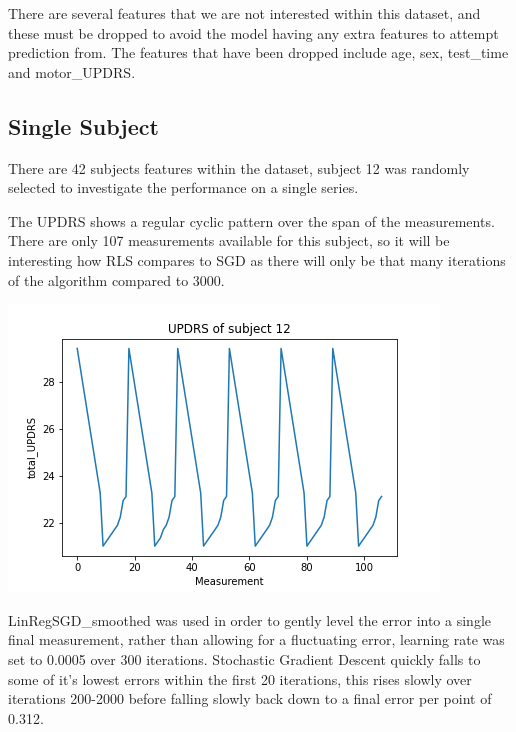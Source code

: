 \documentclass[sigconf]{acmart}
\begin{document}
There are several features that we are not interested within this dataset, and these must be dropped to avoid the model having any extra features to attempt prediction from. The features that have been dropped include age, sex, test\_time and motor\_UPDRS.
\subsection{Single Subject}
There are 42 subjects features within the dataset, subject 12 was randomly selected to investigate the performance on a single series.

The UPDRS shows a regular cyclic pattern over the span of the measurements. There are only 107 measurements available for this subject, so it will be interesting how RLS compares to SGD as there will only be that many iterations of the algorithm compared to 3000.
\begin{center}
    \includegraphics[width=\linewidth]{figs/Parks true single.png}
\end{center}
LinRegSGD\_smoothed was used in order to gently level the error into a single final measurement, rather than allowing for a fluctuating error, learning rate was set to 0.0005 over 300 iterations.
Stochastic Gradient Descent quickly falls to some of it's lowest errors within the first 20 iterations, this rises slowly over iterations 200-2000 before falling slowly back down to a final error per point of 0.312.
\end{document}
